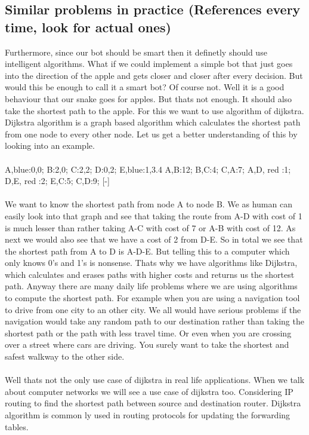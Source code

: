 \documentclass[a4paper,12pt]{article}
\begin{document}
\subsection{Similar problems in practice (References every time, look for actual ones)}
Furthermore, since our bot should be smart then it definetly should use intelligent algorithms. What if we could implement a simple bot that just goes into the direction of the apple and gets closer and closer after every decision. But would this be enough to call it a smart bot? Of course not. Well it is a good behaviour that our snake goes for apples.  But thats not enough. It should also take the shortest path to the apple. For this we want to use algorithm of dijkstra. Dijkstra algorithm is a graph based algorithm which calculates the shortest path from one node to every other node. Let us get a better understanding of this by looking into an example.\\
\\
{
A,blue:0,0;
B:2,0;
C:2,2;
D:0,2;
E,blue:1,3.4
}
{
A,B:12;
B,C:4;
C,A:7; 
A,D, red :1;
D,E, red :2; 
E,C:5;
C,D:9;
}[-]
\mygraph{}
\\
\\We want to know the shortest path from node A to node B. We as human can easily look into that graph and see that taking the route from A-D with cost of 1 is much lesser than rather taking A-C with cost of 7 or A-B with cost of 12. As next we would also see that we have a cost of 2 from D-E. So in total we see that the shortest path from A to D is A-D-E. But telling this to a computer which only knows 0's and 1's is nonsense. Thats why we have algorithms like Dijkstra, which calculates and erases paths with higher costs and returns us the shortest path. Anyway there are many daily life problems where we are using algorithms to compute the shortest path. For example when you are using a navigation tool to drive from one city to an other city. We all would have serious problems if the navigation would take any random path to our destination rather than taking the shortest path or the path with less travel time. Or even when you are crossing over a street where cars are driving. You surely want to take the shortest and safest walkway to the other side.\\
\\Well thats not the only use case of dijkstra in real life applications. When we talk about computer networks we will see a use case of dijkstra too. Considering IP routing to find the shortest path between source and destination router. Dijkstra algorithm is common ly used in routing protocols for updating the forwarding tables.\\
\end{document}
